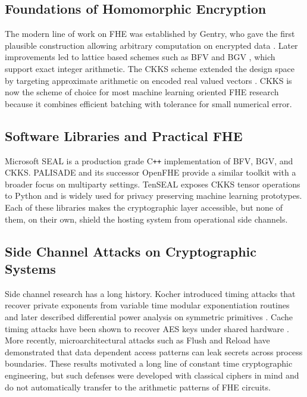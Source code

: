 \documentclass[12pt,a4paper]{article}
\begin{document}
\subsection{Foundations of Homomorphic Encryption}
The modern line of work on FHE was established by Gentry, who gave the first plausible construction allowing arbitrary computation on encrypted data \cite{gentry2009fully}. Later improvements led to lattice based schemes such as BFV \cite{fan2012somewhat} and BGV \cite{brakerski2014leveled}, which support exact integer arithmetic. The CKKS scheme extended the design space by targeting approximate arithmetic on encoded real valued vectors \cite{cheon2017homomorphic}. CKKS is now the scheme of choice for most machine learning oriented FHE research because it combines efficient batching with tolerance for small numerical error.

\subsection{Software Libraries and Practical FHE}
Microsoft SEAL \cite{sealcrypto} is a production grade C\texttt{++} implementation of BFV, BGV, and CKKS. PALISADE and its successor OpenFHE \cite{openfhe2022} provide a similar toolkit with a broader focus on multiparty settings. TenSEAL \cite{benaissa2021tenseal} exposes CKKS tensor operations to Python and is widely used for privacy preserving machine learning prototypes. Each of these libraries makes the cryptographic layer accessible, but none of them, on their own, shield the hosting system from operational side channels.

\subsection{Side Channel Attacks on Cryptographic Systems}
Side channel research has a long history. Kocher introduced timing attacks that recover private exponents from variable time modular exponentiation routines \cite{kocher1996timing} and later described differential power analysis on symmetric primitives \cite{kocher1999dpa}. Cache timing attacks have been shown to recover AES keys under shared hardware \cite{osvik2006cache}. More recently, microarchitectural attacks such as Flush and Reload \cite{yarom2014flush} have demonstrated that data dependent access patterns can leak secrets across process boundaries. These results motivated a long line of constant time cryptographic engineering, but such defenses were developed with classical ciphers in mind and do not automatically transfer to the arithmetic patterns of FHE circuits.
\end{document}
